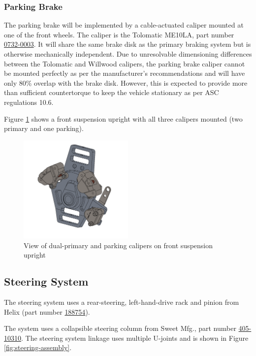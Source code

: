 \documentclass[10pt]{article}
\begin{document}
\subsubsection{Parking Brake}
The parking brake will be implemented by a cable-actuated caliper mounted at one of the front wheels. The caliper is the Tolomatic ME10LA, part number \href{https://www.tolomatic.com/products/product-details/me10-mechanical-disc-brake#/specs-order}{0732-0003}. It will share the same brake disk as the primary braking system but is otherwise mechanically independent. Due to unresolvable dimensioning differences between the Tolomatic and Willwood calipers, the parking brake caliper cannot be mounted perfectly as per the manufacturer's recommendations and will have only 80\% overlap with the brake disk. However, this is expected to provide more than sufficient countertorque to keep the vehicle stationary as per ASC regulations 10.6.

Figure \ref{fig:calipers-mounting-geometry} shows a front suspension upright with all three calipers mounted (two primary and one parking).

\begin{figure}
\centering
\includegraphics[width=0.5\textwidth]{figures/caliper-mounting-geometry}
\caption{View of dual-primary and parking calipers on front suspension upright }
\label{fig:calipers-mounting-geometry}
\end{figure}

\subsection{Steering System}
The steering system uses a rear-steering, left-hand-drive rack and pinion from Helix (part number \href{http://www.helixsuspension.com/catalog/Steering/Manual-Steering-Racks/HEXSR5/Omni-Manual-Steering-Rack---Rear-Steering}{188754}). 

The system uses a collapsible steering column from Sweet Mfg.\@, part number \href{https://sweetmfg.biz/product.php?productid=2836}{405-10310}. The steering system linkage uses multiple U-joints and is shown in Figure \ref{fig:steering-assembly}.
\end{document}
